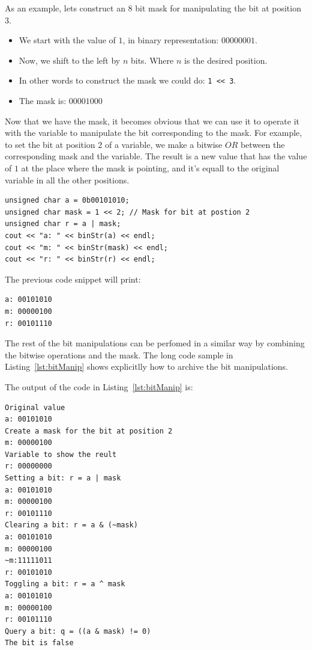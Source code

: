 As an example, lets construct an $8$ bit mask for manipulating the bit at position $3$.
\begin{itemize}
 \item We start with the value of $1$, in binary representation: $00000001$.
 \item Now, we shift to the left by $n$ bits. Where $n$ is the desired position.
 \item In other words to construct the mask we could do: \texttt{1 << 3}.
 \item The mask is: $00001000$
\end{itemize}

Now that we have the mask, it becomes obvious that we can use it to operate it with the variable to manipulate the bit corresponding to the mask.
For example, to set the bit at position $2$ of a variable, we make a bitwise $OR$ between the corresponding mask and the variable.
The result is a new value that has the value of $1$ at the place where the mask is pointing, and it's equall to the original variable in all the other positions.

\begin{verbatim}
unsigned char a = 0b00101010;
unsigned char mask = 1 << 2; // Mask for bit at postion 2
unsigned char r = a | mask;
cout << "a: " << binStr(a) << endl;
cout << "m: " << binStr(mask) << endl;
cout << "r: " << binStr(r) << endl;
\end{verbatim}
The previous code snippet will print:
\begin{verbatim}
a: 00101010
m: 00000100
r: 00101110
\end{verbatim}

The rest of the bit manipulations can be perfomed in a similar way by combining the bitwise operations and the mask.
The long code sample in Listing~\ref{lst:bitManip} shows explicitlly how to archive the bit manipulations.



The output of the code in Listing~\ref{lst:bitManip} is:
\begin{verbatim}
Original value
a: 00101010
Create a mask for the bit at position 2
m: 00000100
Variable to show the reult
r: 00000000
Setting a bit: r = a | mask
a: 00101010
m: 00000100
r: 00101110
Clearing a bit: r = a & (~mask)
a: 00101010
m: 00000100
~m:11111011
r: 00101010
Toggling a bit: r = a ^ mask
a: 00101010
m: 00000100
r: 00101110
Query a bit: q = ((a & mask) != 0)
The bit is false
\end{verbatim}

